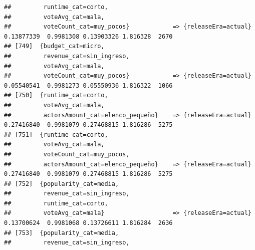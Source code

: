 \documentclass[
]{article}
\begin{document}
\begin{verbatim}
##         runtime_cat=corto,                                                                                                      
##         voteAvg_cat=mala,                                                                                                       
##         voteCount_cat=muy_pocos}            => {releaseEra=actual}               0.13877339  0.9981308 0.13903326 1.816328  2670
## [749]  {budget_cat=micro,                                                                                                       
##         revenue_cat=sin_ingreso,                                                                                                
##         voteAvg_cat=mala,                                                                                                       
##         voteCount_cat=muy_pocos}            => {releaseEra=actual}               0.05540541  0.9981273 0.05550936 1.816322  1066
## [750]  {runtime_cat=corto,                                                                                                      
##         voteAvg_cat=mala,                                                                                                       
##         actorsAmount_cat=elenco_pequeño}    => {releaseEra=actual}               0.27416840  0.9981079 0.27468815 1.816286  5275
## [751]  {runtime_cat=corto,                                                                                                      
##         voteAvg_cat=mala,                                                                                                       
##         voteCount_cat=muy_pocos,                                                                                                
##         actorsAmount_cat=elenco_pequeño}    => {releaseEra=actual}               0.27416840  0.9981079 0.27468815 1.816286  5275
## [752]  {popularity_cat=media,                                                                                                   
##         revenue_cat=sin_ingreso,                                                                                                
##         runtime_cat=corto,                                                                                                      
##         voteAvg_cat=mala}                   => {releaseEra=actual}               0.13700624  0.9981068 0.13726611 1.816284  2636
## [753]  {popularity_cat=media,                                                                                                   
##         revenue_cat=sin_ingreso,                                                                                                

\end{verbatim}
\end{document}
